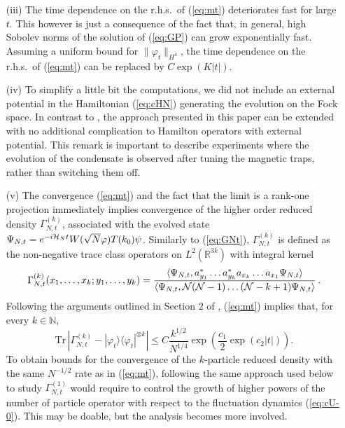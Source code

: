 \documentclass[11pt,a4paper]{article}
\newcommand{\done}{}
\newcommand{\bR}{{\mathbb R}}
\newcommand{\bN}{{\mathbb N}}
\newcommand{\tr}{\mbox{Tr}}
\newcommand{\cH}{{\cal H}}
\newcommand{\cN}{{\cal N}}
\begin{document}
\begin{itemize}
%
\item[(iii)] The time dependence on the r.h.s.\ of (\ref{eq:mt}) deteriorates fast for large $t$. This however is just a consequence of the fact that, in general, high Sobolev norms of the solution of (\ref{eq:GP}) can grow exponentially fast. Assuming a uniform bound for $\| \varphi_t \|_{H^4}$, the time dependence on the r.h.s.\ of (\ref{eq:mt}) can be replaced by $C \exp (K |t|)$. 
\item[(iv)] To simplify a little bit the computations, we did not include an external potential in the Hamiltonian (\ref{eq:cHN}) generating the evolution on the Fock space. In contrast to \cite{ESY1,ESY2,ESY3,ESY4}, the approach presented in this paper can be extended with no additional complication to Hamilton operators with external potential. This remark is important to describe experiments where the evolution of the condensate is observed after tuning the magnetic traps, rather than switching them off. 
\item[(v)] The convergence (\ref{eq:mt}) and the fact that the limit is a rank-one projection immediately implies convergence of the higher order reduced density $\Gamma_{N,t}^{(k)}$, associated with the evolved state $\Psi_{N,t} = e^{-i\cH_N t} W(\sqrt{N} \varphi) T(k_0) \psi$. Similarly to (\ref{eq:GNt}), $\Gamma^{(k)}_{N,t}$ is defined as the non-negative trace class operators on $L^2 (\bR^{3k})$ with integral kernel
\[ \Gamma_{N,t}^{(k)} (x_1, \dots , x_k ; y_1, \dots, y_k) = \frac{\langle \Psi_{N,t}, a_{y_1}^* \dots a_{y_k}^* a_{x_k} \dots a_{x_1} \Psi_{N,t} \rangle}{\langle \Psi_{N,t} , \cN ( \cN-1) \dots (\cN-k+1) \Psi_{N,t} \rangle} \, .  \]
Following the arguments outlined in Section 2 of \cite{KP2009}, (\ref{eq:mt}) implies that, for every $k \in \bN$,
\[ \tr \, \left| \Gamma^{(k)}_{N,t} - |\varphi_t \rangle \langle \varphi_t|^{\otimes k} \right| \leq C \frac{k^{1/2}}{N^{1/4}} \exp\left(\frac{c_1}{2} \exp (c_2 |t|)\right).\done \]
To obtain bounds for the convergence of the $k$-particle reduced density with the same $N^{-1/2}$ rate as in (\ref{eq:mt}), following the same approach used below to study $\Gamma^{(1)}_{N,t}$ would require to control the growth of higher powers of the number of particle operator with respect to the fluctuation dynamics (\ref{eq:cU-0}). This may be doable, but the analysis becomes more involved. 

\end{itemize}
\end{document}
